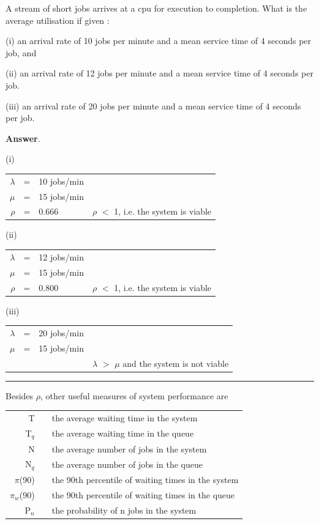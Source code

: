 \documentclass[12pt,fleqn]{report}
\begin{document}
 A stream of short jobs arrives at a cpu for execution
to completion. What is the average utilisation if
given :

(i) an arrival rate of 10 jobs per minute 
         and a mean service time of 4 seconds per job, and

(ii) an arrival rate of 12 jobs per minute 
         and a mean service time of 4 seconds per job.

(iii) an arrival rate of 20 jobs per minute 
         and a mean service time of 4 seconds per job.

\noindent
{\bf Answer}.

(i) \begin{tabular}{r c l r}
     $\lambda$ & = & 10 jobs/min \\
     $\mu$     & = & 15 jobs/min \\
     $\rho$    & = & 0.666       & $\rho$ $<$ 1, i.e. the system is
     viable \\
     \end{tabular}

(ii)      \begin{tabular}{r c l r}
     $\lambda$ & = & 12 jobs/min \\
     $\mu$     & = & 15 jobs/min \\
     $\rho$    & = & 0.800       & $\rho$ $<$ 1, i.e. the system is
     viable \\
     \end{tabular}

(iii)      \begin{tabular}{r c l r}
     $\lambda$ & = & 20 jobs/min \\
     $\mu$     & = & 15 jobs/min \\
               &    &           &  $\lambda$ $>$ $\mu$ and the system is not
     viable \\
     \end{tabular}

\noindent
\rule{160mm}{0.5mm} 

Besides $\rho$, other useful measures of system performance are

\begin{tabular}{r c l}
T     & & the average waiting time in the system \\
T$_q$ & & the average waiting time in the queue  \\
N     & & the average number of jobs in the system \\
N$_q$ & & the average number of jobs in the queue \\
$\pi$(90) &  & the 90th percentile of waiting times in the system\\
$\pi$$_w$(90) &  & the 90th percentile of waiting times in the queue\\
P$_n$ & & the probability of n jobs in the system  \\
\end{tabular}
\end{document}

